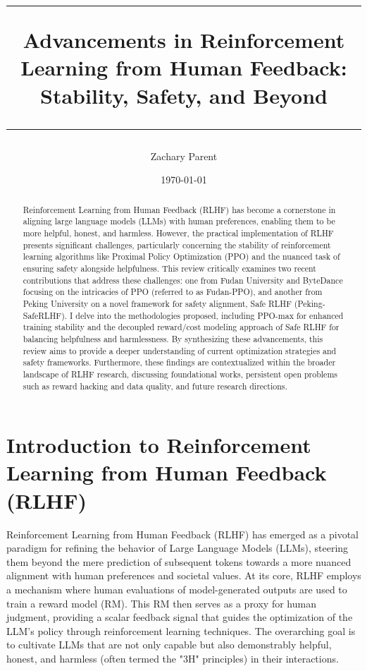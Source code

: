\documentclass{article}
\title{
    \rule{\textwidth}{2pt}
    Advancements in Reinforcement Learning from Human Feedback: Stability, Safety, and Beyond
    \rule{\textwidth}{1pt}
}
\author{Zachary Parent}
\date{\today}
\begin{document}
\maketitle

\begin{abstract}
Reinforcement Learning from Human Feedback (RLHF) has become a cornerstone in aligning large language models (LLMs) with human preferences, enabling them to be more helpful, honest, and harmless. However, the practical implementation of RLHF presents significant challenges, particularly concerning the stability of reinforcement learning algorithms like Proximal Policy Optimization (PPO) and the nuanced task of ensuring safety alongside helpfulness. This review critically examines two recent contributions that address these challenges: one from Fudan University and ByteDance focusing on the intricacies of PPO (referred to as Fudan-PPO), and another from Peking University on a novel framework for safety alignment, Safe RLHF (Peking-SafeRLHF). I delve into the methodologies proposed, including PPO-max for enhanced training stability and the decoupled reward/cost modeling approach of Safe RLHF for balancing helpfulness and harmlessness. By synthesizing these advancements, this review aims to provide a deeper understanding of current optimization strategies and safety frameworks. Furthermore, these findings are contextualized within the broader landscape of RLHF research, discussing foundational works, persistent open problems such as reward hacking and data quality, and future research directions.
\end{abstract}

\section{Introduction to Reinforcement Learning from Human Feedback (RLHF)}
\label{sec:introduction}

Reinforcement Learning from Human Feedback (RLHF) has emerged as a pivotal paradigm for refining the behavior of Large Language Models (LLMs), steering them beyond the mere prediction of subsequent tokens towards a more nuanced alignment with human preferences and societal values. \cite{Ouyang2022InstructGPT} At its core, RLHF employs a mechanism where human evaluations of model-generated outputs are used to train a reward model (RM). This RM then serves as a proxy for human judgment, providing a scalar feedback signal that guides the optimization of the LLM's policy through reinforcement learning techniques. The overarching goal is to cultivate LLMs that are not only capable but also demonstrably helpful, honest, and harmless (often termed the "3H" principles) in their interactions. \cite{Ouyang2022InstructGPT}
\end{document}
